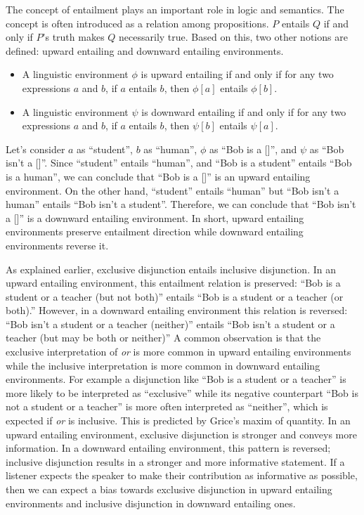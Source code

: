 \documentclass[oneside]{report}
\theoremstyle{definition}
\theoremstyle{definition}
\theoremstyle{definition}
\theoremstyle{remark}
\begin{document}
The concept of entailment plays an important role in logic and
semantics. The concept is often introduced as a relation among
propositions. \(P\) entails \(Q\) if and only if \(P\)'s truth makes
\(Q\) necessarily true. Based on this, two other notions are defined:
upward entailing and downward entailing environments.
\begin{itemize}
\item
  A linguistic environment \(\phi\) is upward entailing if and only if
  for any two expressions \(a\) and \(b\), if \(a\) entails \(b\), then
  \(\phi[a]\) entails \(\phi[b]\).
\item
  A linguistic environment \(\psi\) is downward entailing if and only if
  for any two expressions \(a\) and \(b\), if \(a\) entails \(b\), then
  \(\psi[b]\) entails \(\psi[a]\).
\end{itemize}
Let's consider \(a\) as ``student'', \(b\) as ``human'', \(\phi\) as
``Bob is a {[}{]}'', and \(\psi\) as ``Bob isn't a {[}{]}''. Since
``student'' entails ``human'', and ``Bob is a student'' entails ``Bob is
a human'', we can conclude that ``Bob is a {[}{]}'' is an upward
entailing environment. On the other hand, ``student'' entails ``human''
but ``Bob isn't a human'' entails ``Bob isn't a student''. Therefore, we
can conclude that ``Bob isn't a {[}{]}'' is a downward entailing
environment. In short, upward entailing environments preserve entailment
direction while downward entailing environments reverse it.

As explained earlier, exclusive disjunction entails inclusive
disjunction. In an upward entailing environment, this entailment
relation is preserved: ``Bob is a student or a teacher (but not both)''
entails ``Bob is a student or a teacher (or both).'' However, in a
downward entailing environment this relation is reversed: ``Bob isn't a
student or a teacher (neither)'' entails ``Bob isn't a student or a
teacher (but may be both or neither)'' A common observation is that the
exclusive interpretation of \emph{or} is more common in upward entailing
environments while the inclusive interpretation is more common in
downward entailing environments. For example a disjunction like ``Bob is
a student or a teacher'' is more likely to be interpreted as
``exclusive'' while its negative counterpart ``Bob is not a student or a
teacher'' is more often interpreted as ``neither'', which is expected if
\emph{or} is inclusive. This is predicted by Grice's maxim of quantity.
In an upward entailing environment, exclusive disjunction is stronger
and conveys more information. In a downward entailing environment, this
pattern is reversed; inclusive disjunction results in a stronger and
more informative statement. If a listener expects the speaker to make
their contribution as informative as possible, then we can expect a bias
towards exclusive disjunction in upward entailing environments and
inclusive disjunction in downward entailing ones.
\end{document}
